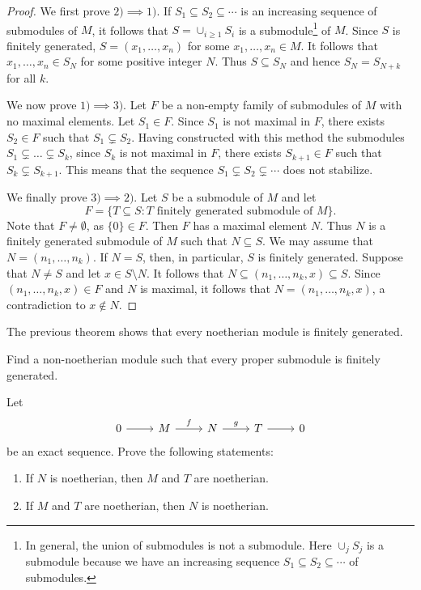 \begin{proof}
	We first prove $2)\implies1)$. If $S_1\subseteq S_2\subseteq\cdots$ is an increasing 
        sequence of submodules of $M$, 
	it follows that $S=\cup_{i\geq 1}S_i$ is a submodule\footnote{In general, the union of submodules is not a submodule. Here $\cup_jS_j$ is a submodule because we have an increasing sequence $S_1\subseteq S_2\subseteq\cdots$ of submodules.} 
 of $M$. Since $S$ is finitely generated, 
	$S=(x_1,\dots,x_n)$ for some $x_1,\dots,x_n\in M$. It follows that 
	$x_1,\dots,x_n\in S_N$ for some positive integer $N$. Thus 
	$S\subseteq S_N$ and hence $S_N=S_{N+k}$ for all $k$. 
	
	We now prove $1)\implies3)$. Let $F$ be a non-empty family of submodules of $M$ with no maximal elements. 
	Let $S_1\in F$. Since $S_1$ is not maximal in $F$, there exists $S_2\in F$ such that $S_1\subsetneq S_2$. 
	Having constructed with this method the submodules $S_1\subsetneq\dots\subsetneq S_k$, since $S_k$ is not
	maximal in $F$, there exists $S_{k+1}\in F$ such that $S_k\subsetneq S_{k+1}$. 
	This means that the sequence 
	$S_1\subsetneq S_2\subsetneq\cdots$ does not stabilize. 
	
	We finally prove $3)\implies2)$. Let $S$ be a submodule of $M$ and let 
	\[
	F=\{T\subseteq S:T\text{ finitely generated submodule of $M$}\}.
	\]
	Note that $F\ne\emptyset$, as $\{0\}\in F$. 
	Then $F$ has a maximal element $N$. Thus
	$N$ is a finitely generated submodule of $M$ such that $N\subseteq S$. We may assume that 
	$N=(n_1,\dots,n_k)$. If $N=S$, then, in particular, $S$ is finitely generated. Suppose that
	$N\ne S$ and let $x\in S\setminus N$. It follows that  
	$N\subseteq (n_1,\dots,n_k,x)\subseteq S$. Since 
	$(n_1,\dots,n_k,x)\in F$ and $N$ is maximal, it follows that 
	$N=(n_1,\dots,n_k,x)$, a contradiction
	to $x\not\in N$. 
\end{proof}

The previous theorem shows that every noetherian module is finitely generated. 

\begin{exercise}
\label{xca:Pruffer}
Find a non-noetherian module such that every proper submodule is finitely generated. 	
\end{exercise}

\begin{exercise}
\label{xca:exacta_noetheriano}
	Let   
\[\begin{tikzcd}
	0 & M & N & T & 0
	\arrow[from=1-1, to=1-2]
	\arrow["f", from=1-2, to=1-3]
	\arrow["g", from=1-3, to=1-4]
	\arrow[from=1-4, to=1-5]
\end{tikzcd}
\]
     be an exact sequence. Prove the following statements:
     \begin{enumerate}
     	\item If $N$ is noetherian, then $M$ and $T$ are noetherian.
     	\item If $M$ and $T$ are noetherian, then $N$ is noetherian.
     \end{enumerate}	
\end{exercise}

